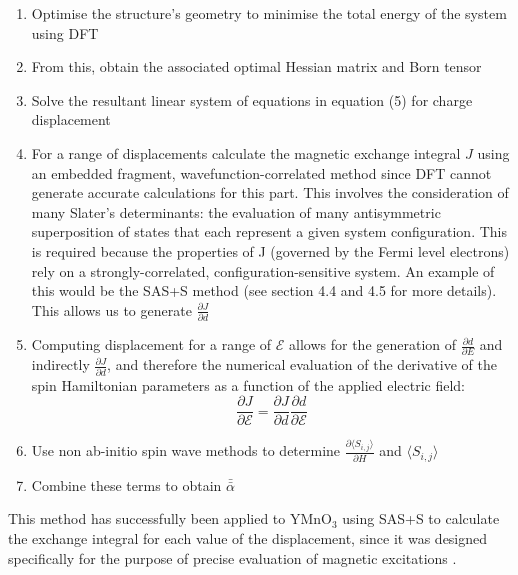 \documentclass[10pt]{article}
\begin{document}
\begin{enumerate}
	\item Optimise the structure's geometry to minimise the total energy of the system using DFT
	\item From this, obtain the associated optimal Hessian matrix and Born tensor
	\item Solve the resultant linear system of equations in equation (5) for charge displacement
	\item For a range of displacements calculate the magnetic exchange integral $J$ using an embedded fragment, wavefunction-correlated method since DFT cannot generate accurate calculations for this part. This involves the consideration of many Slater's determinants: the evaluation of many antisymmetric superposition of states that each represent a given system configuration. This is required because the properties of J (governed by the Fermi level electrons) rely on a strongly-correlated, configuration-sensitive system. An example of this would be the SAS+S method (see section 4.4 and 4.5 for more details). This allows us to generate $\frac{\partial J}{\partial d}$
	\item Computing displacement for a range of $\mathcal{E}$ allows for the generation of $\frac{\partial d}{\partial E}$ and indirectly $\frac{\partial J}{\partial d}$, and therefore the numerical evaluation of the derivative of the spin Hamiltonian parameters as a function of the applied electric field:
	\begin{equation*}
	\dfrac{\partial J}{\partial \mathcal{E}} = \dfrac{\partial J}{\partial d}\dfrac{\partial d}{\partial \mathcal{E}}
	\end{equation*}
	\item Use non ab-initio spin wave methods to determine $\frac{\partial\langle S_{i,j}\rangle}{\partial H}$ and $\langle S_{i,j}\rangle$
	\item Combine these terms to obtain $\bar{\bar{\alpha}}$
\end{enumerate}

This method has successfully been applied to YMnO$_3$ using SAS+S to calculate the exchange integral for each value of the displacement, since it was designed specifically for the purpose of precise evaluation of magnetic excitations \cite{varignon2013ab}.
\end{document}
